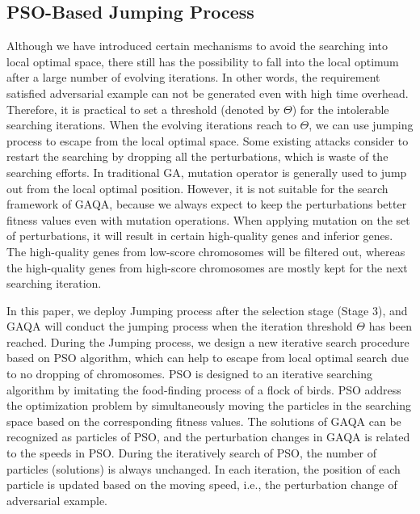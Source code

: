 \documentclass[lettersize,journal]{IEEEtran}
\begin{document}
	\subsection{PSO-Based Jumping Process}
	Although we have introduced certain mechanisms to avoid the searching into local optimal space, there still has the possibility to fall into the local optimum after a large number of evolving iterations. In other words, the requirement satisfied adversarial example can not be generated even with high time overhead. Therefore, it is practical to set a threshold (denoted by $\Theta$) for the intolerable searching iterations. When the evolving iterations reach to $\Theta$, we can use jumping process to escape from the local optimal space. Some existing attacks \cite{2017Towards} consider to restart the searching by dropping all the perturbations, which is waste of the searching efforts. In traditional GA, mutation operator is generally used to jump out from the local optimal position.
	However, it is not suitable for the search framework of GAQA, because we always expect to keep the perturbations better fitness values even with mutation operations. When applying mutation on the set of perturbations, it will result in certain high-quality genes and inferior genes. The high-quality genes from low-score chromosomes will be filtered out, whereas the high-quality genes from high-score chromosomes are mostly kept for the next searching iteration.
	
	In this paper, we deploy Jumping process after the selection stage (Stage 3), and GAQA will conduct the jumping process when the iteration threshold $\Theta$ has been reached. During the Jumping process, we design a new iterative search procedure based on PSO algorithm, which can help to escape from local optimal search due to no dropping of chromosomes. PSO is designed to an iterative searching algorithm by imitating the food-finding process of a flock of birds. PSO address the optimization problem by simultaneously moving the particles in the searching space based on the corresponding fitness values. The solutions of GAQA can be recognized as particles of PSO, and the perturbation changes in GAQA is related to the speeds in PSO. During the iteratively search of PSO, the number of particles (solutions) is always unchanged. In each iteration, the position of each particle is updated based on the moving speed, i.e., the perturbation change of adversarial example.         
	
\end{document}
